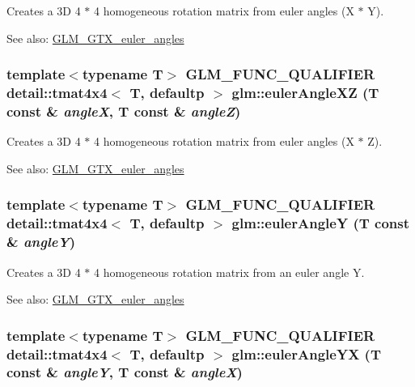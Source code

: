 Creates a 3D 4 $\ast$ 4 homogeneous rotation matrix from euler angles (X $\ast$ Y). \begin{Desc}
\item[See also:]\hyperlink{group__gtx__euler__angles}{GLM\_\-GTX\_\-euler\_\-angles} \end{Desc}
\hypertarget{group__gtx__euler__angles_g9b63e52fda0b7773c50bbf3c310bdcf2}{
\subsubsection[eulerAngleXZ]{\setlength{\rightskip}{0pt plus 5cm}template$<$typename T$>$ GLM\_\-FUNC\_\-QUALIFIER detail::tmat4x4$<$ T, defaultp $>$ glm::eulerAngleXZ (T const \& {\em angleX}, \/  T const \& {\em angleZ})}}
\label{group__gtx__euler__angles_g9b63e52fda0b7773c50bbf3c310bdcf2}


Creates a 3D 4 $\ast$ 4 homogeneous rotation matrix from euler angles (X $\ast$ Z). \begin{Desc}
\item[See also:]\hyperlink{group__gtx__euler__angles}{GLM\_\-GTX\_\-euler\_\-angles} \end{Desc}
\hypertarget{group__gtx__euler__angles_g558b0e0fd3c1f6a414d184a22c968b79}{
\subsubsection[eulerAngleY]{\setlength{\rightskip}{0pt plus 5cm}template$<$typename T$>$ GLM\_\-FUNC\_\-QUALIFIER detail::tmat4x4$<$ T, defaultp $>$ glm::eulerAngleY (T const \& {\em angleY})}}
\label{group__gtx__euler__angles_g558b0e0fd3c1f6a414d184a22c968b79}


Creates a 3D 4 $\ast$ 4 homogeneous rotation matrix from an euler angle Y. \begin{Desc}
\item[See also:]\hyperlink{group__gtx__euler__angles}{GLM\_\-GTX\_\-euler\_\-angles} \end{Desc}
\hypertarget{group__gtx__euler__angles_gd26afd5add0e121296d3b44dea32f32e}{
\subsubsection[eulerAngleYX]{\setlength{\rightskip}{0pt plus 5cm}template$<$typename T$>$ GLM\_\-FUNC\_\-QUALIFIER detail::tmat4x4$<$ T, defaultp $>$ glm::eulerAngleYX (T const \& {\em angleY}, \/  T const \& {\em angleX})}}
\label{group__gtx__euler__angles_gd26afd5add0e121296d3b44dea32f32e}


